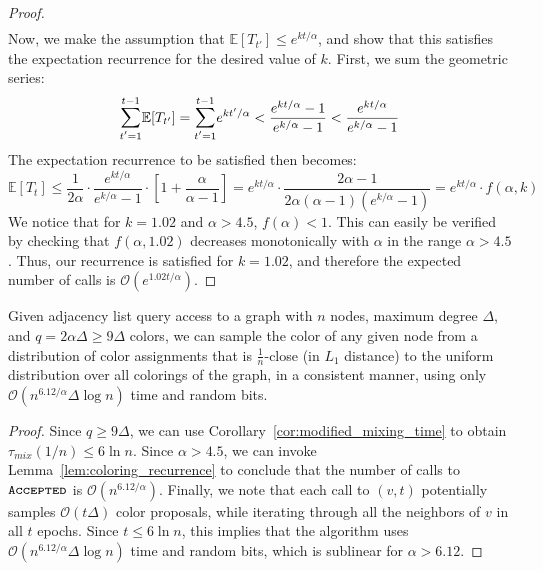 \begin{proof}
\begin{align}
\end{align}
Now, we make the assumption that $\mathbb E[T_{t'}]\le e^{k t/\alpha}$,
and show that this satisfies the expectation recurrence for the desired value of $k$.
First, we sum the geometric series:
\[
\mathlarger\sum\limits_{t'=1}^{t-1} \mathbb E[T_{t'}] = \mathlarger\sum\limits_{t'=1}^{t-1} e^{k t'/\alpha}
< \frac{e^{k t/\alpha}-1}{e^{k/\alpha}-1} < \frac{e^{k t/\alpha}}{e^{k/\alpha}-1}
\]
The expectation recurrence to be satisfied then becomes:
\[
\mathbb E[T_t]\le \frac 1{2\alpha}\cdot \frac{e^{k t/\alpha}}{e^{k/\alpha}-1}\cdot \left[ 1+ \frac{\alpha}{\alpha-1} \right]
= e^{k t/\alpha}\cdot \frac{2\alpha-1}{2\alpha(\alpha-1)(e^{k/\alpha}-1)} = e^{k t/\alpha}\cdot f(\alpha, k)
\]
We notice that for $k=1.02$ and $\alpha > 4.5$, $f(\alpha) < 1$.
This can easily be verified by checking that $f(\alpha,1.02)$ decreases monotonically with $\alpha$ in the range $\alpha > 4.5$.
Thus, our recurrence is satisfied for $k=1.02$, and therefore the expected number of calls is $\mathcal O(e^{1.02t/\alpha})$.
\end{proof}


\begin{theorem}
\label{thm:coloring_generator_main}
Given adjacency list query access to a graph with $n$ nodes, maximum degree $\Delta$, and $q=2\alpha\Delta \ge 9\Delta$ colors,
we can sample the color of any given node from a distribution of color assignments that is $\frac{1}{n}$-close (in $L_1$ distance)
to the uniform distribution over all colorings of the graph, in a consistent manner,
using only $\mathcal O(n^{6.12/\alpha}\Delta\log n)$ time and random bits.
\end{theorem}
\begin{proof}
Since $q\ge 9\Delta$, we can use Corollary~\ref{cor:modified_mixing_time} to obtain $\tau_{mix}(1/n) \le 6\ln n$.
Since $\alpha > 4.5$, we can invoke Lemma~\ref{lem:coloring_recurrence} to conclude that
the number of calls to $\texttt{\textsc{Accepted}}$ is $\mathcal O(n^{6.12/\alpha})$.
Finally, we note that each call to $(v,t)$ potentially samples $\mathcal O(t\Delta)$ color proposals,
while iterating through all the neighbors of $v$ in all $t$ epochs.
Since $t \le 6\ln n$, this implies that the algorithm uses $\mathcal O(n^{6.12/\alpha}\Delta\log n)$ time and random bits,
which is sublinear for $\alpha > 6.12$.
\end{proof}

